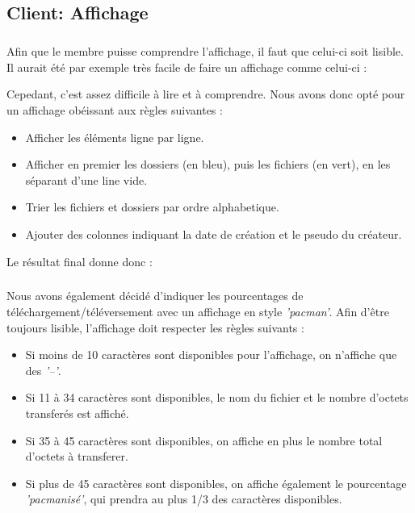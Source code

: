 \documentclass[12pt,a4paper,twoside]{article}
\begin{document}
		\subsection{Client: Affichage} %
			\subparagraph*{}
				Afin que le membre puisse comprendre l'affichage, il faut que celui-ci soit lisible. Il aurait été par exemple très facile de faire un affichage comme celui-ci :
				
				Cepedant, c'est assez difficile à lire et à comprendre. Nous avons donc opté pour un affichage obéissant aux règles suivantes :
				\begin{itemize}
					\item{} Afficher les éléments ligne par ligne.
					\item{} Afficher en premier les dossiers (en bleu), puis les fichiers (en vert), en les séparant d'une line vide.
					\item{} Trier les fichiers et dossiers par ordre alphabetique.
					\item{} Ajouter des colonnes indiquant la date de création et le pseudo du créateur.
				\end{itemize}
				Le résultat final donne donc :
				
			\subparagraph*{}
				Nous avons également décidé d'indiquer les pourcentages de téléchargement/téléversement avec un affichage en style \textit{'pacman'}. Afin d'être toujours lisible, l'affichage doit respecter les règles suivants :
				\begin{itemize}
					\item{} Si moins de 10 caractères sont disponibles pour l'affichage, on n'affiche que des \textit{'–'}.
					\item{} Si 11 à 34 caractères sont disponibles, le nom du fichier et le nombre d'octets transferés est affiché.
					\item{} Si 35 à 45 caractères sont disponibles, on affiche en plus le nombre total d'octets à transferer.
					\item{} Si plus de 45 caractères sont disponibles, on affiche également le pourcentage \textit{'pacmanisé'}, qui prendra au plus 1/3 des caractères disponibles.
				 \end{itemize}
\end{document}

